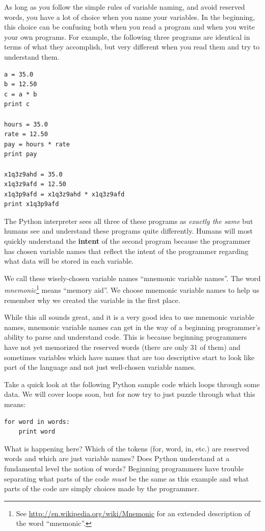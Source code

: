 \documentclass[10pt]{book}
\begin{document}

As long as you follow the simple rules of variable naming, and avoid
reserved words, you have a lot of choice when you name your variables.
In the beginning, this choice can be confusing both when you read a 
program and when you write your own programs.  For example, the
following three programs are identical in terms of what they accomplish,
but very different when you read them and try to understand them.

\beforeverb
\begin{verbatim}
a = 35.0
b = 12.50
c = a * b
print c

hours = 35.0
rate = 12.50
pay = hours * rate
print pay

x1q3z9ahd = 35.0
x1q3z9afd = 12.50
x1q3p9afd = x1q3z9ahd * x1q3z9afd
print x1q3p9afd
\end{verbatim}
\afterverb
%
The Python interpreter sees all three of these programs as \emph{exactly the 
same} but humans see and understand these programs quite differently.  
Humans will most quickly understand the {\bf intent} 
of the second program because the 
programmer has chosen variable names that reflect the intent of the programmer
regarding what data will be stored in each variable.

We call these wisely-chosen variable names ``mnemonic variable names''.  The
word \emph{mnemonic}\footnote{See 
\url{http://en.wikipedia.org/wiki/Mnemonic}
for an extended description of the word ``mnemonic''.} 
means ``memory aid''.
We choose mnemonic variable names to help us remember why we created the variable
in the first place.

While this all sounds great, and it is a very good idea to use mnemonic variable
names, mnemonic variable names can get in the way of a beginning programmer's 
ability to parse and understand code.  This is because beginning programmers 
have not yet memorized the reserved words (there are only 31 of them) and sometimes
variables which have names that are too descriptive start to look like 
part of the language and not just well-chosen variable names.

Take a quick look at the following Python sample code which loops through some data. 
We will cover loops soon, but for now try to just puzzle through what this means:

\beforeverb
\begin{verbatim}
for word in words:
    print word
\end{verbatim}
\afterverb
%
What is happening here?  Which of the tokens (for, word, in, etc.) are reserved words
and which are just variable names?  Does Python understand at a fundamental level 
the notion of words?  Beginning programmers have 
trouble separating what parts of the
code \emph{must} be the same as this example and what parts of the code are simply
choices made by the programmer.
\end{document}
